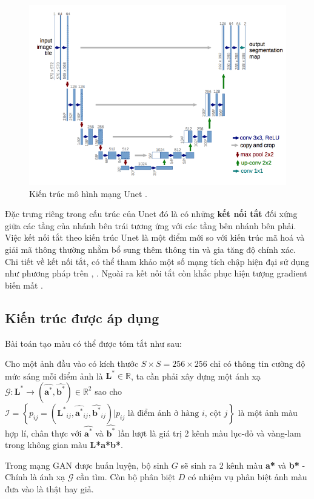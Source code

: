 \documentclass[a4paper, 12pt]{article}
\begin{document}
\begin{figure}[!h]
\captionsetup{width=0.8\textwidth}
\centering
\includegraphics[width=15cm]{images/2_8.png}
\caption{Kiến trúc mô hình mạng Unet \cite{ronneberger2015unet}.}
\end{figure}

\noindent
Đặc trưng riêng trong cấu trúc của Unet đó là có những \textbf{kết nối tắt} đối xứng giữa các tầng của nhánh bên trái tương ứng với các tầng bên nhánh bên phải. Việc kết nối tắt theo kiến trúc Unet là một điểm mới so với kiến trúc mã hoá và giải mã thông thường nhằm bổ sung thêm thông tin và gia tăng độ chính xác. Chi tiết về kết nối tắt, có thể tham khảo một số mạng tích chập hiện đại sử dụng như phương pháp trên \cite{he2015deep}, \cite{huang2018densely}. Ngoài ra kết nối tắt còn khắc phục hiện tượng gradient biến mất \cite{adaloglou2020skip}.

\subsection{Kiến trúc được áp dụng}
Bài toán tạo màu có thể được tóm tắt như sau:
\begin{tcolorbox}
Cho một ảnh đầu vào có kích thước $S\times S = 256\times 256$ chỉ có thông tin cường độ mức sáng mỗi điểm ảnh là $\mathbf{L^*} \in \mathbb{R}$, ta cần phải xây dựng một ánh xạ $\mathcal{G}: \mathbf{L^*} \rightarrow \left(\widehat{\mathbf{a^*}}, \widehat{\mathbf{b^*}}\right) \in \mathbb{R}^2$ sao cho $\mathcal{I} = \left\{p_{ij} = \left(\mathbf{L^*}_{ij}, \widehat{\mathbf{a^*}}_{ij}, \widehat{\mathbf{b^*}}_{ij}\right)\vert p_{ij} \text{ là điểm ảnh ở hàng } i \text{, cột } j\right\}$ là một ảnh màu hợp lí, chân thực với $\widehat{\mathbf{a^*}}$ và $\widehat{\mathbf{b^*}}$ lần lượt là giá trị 2 kênh màu lục-đỏ và vàng-lam trong không gian màu \textbf{L*a*b*}.
\end{tcolorbox}
\noindent
Trong mạng GAN được huấn luyện, bộ sinh $G$ sẽ sinh ra 2 kênh màu \textbf{a*} và \textbf{b*} - Chính là ánh xạ $\mathcal{G}$ cần tìm. Còn bộ phân biệt $D$ có nhiệm vụ phân biệt ảnh màu đưa vào là thật hay giả.
\end{document}
